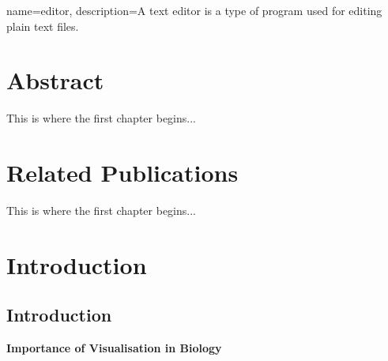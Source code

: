 
{
	name={editor},
	description={A text editor is a type of program used for editing plain text files.}
}

\chapter{Abstract}


This is where the first chapter begins...


\chapter{Related Publications}

This is where the first chapter begins...

\chapter{Introduction}

\section{Introduction}

%
%
%
%
%
%
%


\textbf{Importance of Visualisation in Biology}



